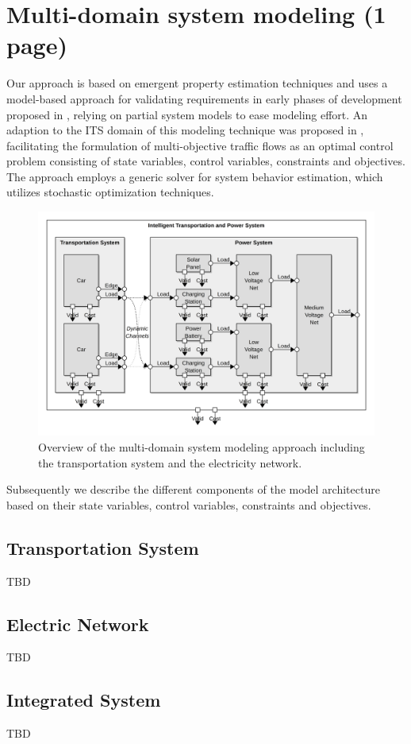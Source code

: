 \section{Multi-domain system modeling (1 page)}
\label{section:contribution_1}

Our approach is based on emergent property estimation techniques \cite{hackenberg2012towards} and uses a model-based approach for validating requirements in early phases of development proposed in \cite{hackenberg2014rapid}, relying on partial system models to ease modeling effort. An adaption to the ITS domain of this modeling technique was proposed in \cite{ascher2014early}, facilitating the formulation of multi-objective traffic flows as an optimal control problem consisting of state variables, control variables, constraints and objectives. The approach employs a generic solver for system behavior estimation, which utilizes stochastic optimization techniques.

\begin{figure}[h]
	\centering
	\includegraphics[width=\columnwidth]{../gfx/model.png}
	\caption{Overview of the multi-domain system modeling approach including the transportation system and the electricity network.}
	\label{fig:model}
\end{figure}

Subsequently we describe the different components of the model architecture based on their state variables, control variables, constraints and objectives. 

\subsection{Transportation System}

TBD

\subsection{Electric Network}

TBD

\subsection{Integrated System}

TBD